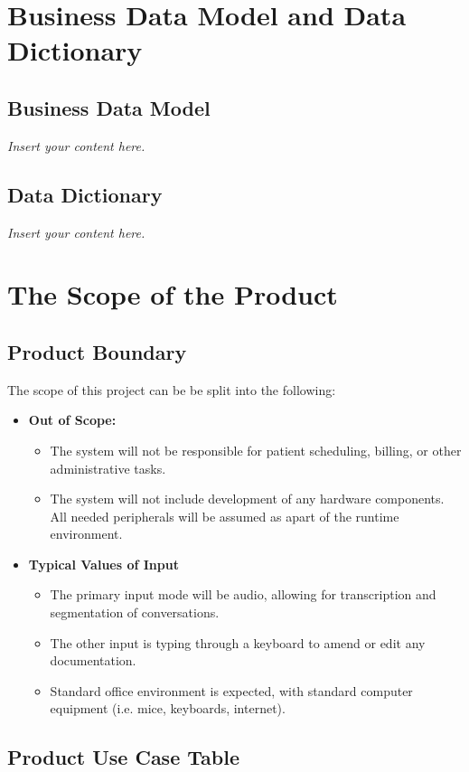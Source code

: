 \documentclass[12pt]{article}
\newcommand{\lips}{\textit{Insert your content here.}}
\begin{document}
\section{Business Data Model and Data Dictionary}
\subsection{Business Data Model}
\lips
\subsection{Data Dictionary}
\lips

\section{The Scope of the Product}
\subsection{Product Boundary}
The scope of this project can be be split into the following:

\begin{itemize}
  \item \textbf{Out of Scope:}
  \begin{itemize}
    \item The system will not be responsible for patient scheduling, billing, or other administrative tasks.
    \item The system will not include development of any hardware components. All needed peripherals will be assumed as apart of the runtime environment.
  \end{itemize}
  \item \textbf{Typical Values of Input}
  \begin{itemize}
    \item The primary input mode will be audio, allowing for transcription and segmentation of conversations.
    \item The other input is typing through a keyboard to amend or edit any documentation.
    \item Standard office environment is expected, with standard computer equipment (i.e. mice, keyboards, internet).
  \end{itemize}
\end{itemize}

\subsection{Product Use Case Table}
\end{document}

